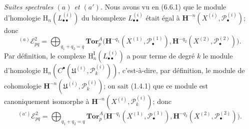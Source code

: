 \begin{env}[6.6.3]
\emph{Suites spectrales $(a)$ et $(a')$.} Nous avons vu en (6.6.1) que le
module d'homologie $\mathrm H_n(L_{\bullet\bullet}^{(i)})$ du bicomplexe
$L_{\bullet\bullet}^{(i)}$ était égal à
$\mathbf H^{-n}(X^{(i)},\mathscr P_\bullet^{(i)})$; donc
\[
  {}^{(a)}\mathscr E_{pq}^2
  =\bigoplus_{q_1+q_2=q}
   \mathbf{Tor}_p^A
   \bigl(\mathbf H^{-q_1}(X^{(1)},\mathscr P_\bullet^{(1)}),
         \mathbf H^{-q_2}(X^{(2)},\mathscr P_\bullet^{(2)})\bigr).
\]
Par définition, le complexe
$\mathrm H_n^{\mathrm I}(L_{\bullet\bullet}^{(i)})$ a pour terme de degré $k$
le module d'homologie
$\mathrm H_n(C^\bullet(\mathfrak U^{(i)},\mathscr P_k^{(i)}))$, c'est-à-dire,
par définition, le module de cohomologie
$\mathbf H^{-n}(\mathfrak U^{(i)},\mathscr P_k^{(i)})$; on sait (1.4.1) que
ce module est canoniquement isomorphe à
$\mathbf H^{-n}(X^{(i)},\mathscr P_k^{(i)})$; donc
\[
  {}^{(a')}\mathscr E_{pq}^2
  =\bigoplus_{q_1+q_2=q}
   \mathbf{Tor}_p^A
   \bigl(\mathbf H^{-q_1}(X^{(1)},\mathscr P_\bullet^{(1)}),
         \mathbf H^{-q_2}(X^{(2)},\mathscr P_\bullet^{(2)})\bigr).
\]
\end{env}

